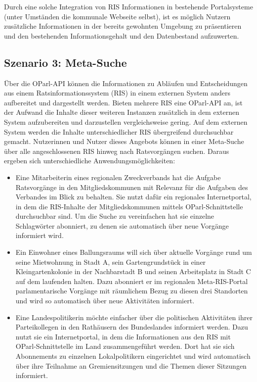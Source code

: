 \documentclass[,a4paper]{article}
\begin{document}
Durch eine solche Integration von RIS Informationen in bestehende
Portalsysteme (unter Umständen die kommunale Webseite selbst), ist es
möglich Nutzern zusätzliche Informationen in der bereits gewohnten
Umgebung zu präsentieren und den bestehenden Informationsgehalt und den
Datenbestand aufzuwerten.

\subsection{Szenario 3: Meta-Suche}\label{szenarioux5fmetaux5fsuche}

Über die OParl-API können die Informationen zu Abläufen und
Entscheidungen aus einem Ratsinformationssystem (RIS) in einem externen
System anders aufbereitet und dargestellt werden. Bieten mehrere RIS
eine OParl-API an, ist der Aufwand die Inhalte dieser weiteren Instanzen
zusätzlich in dem externen System aufzubereiten und darzustellen
vergleichsweise gering. Auf dem externen System werden die Inhalte
unterschiedlicher RIS übergreifend durchsuchbar gemacht. Nutzerinnen und
Nutzer dieses Angebots können in einer Meta-Suche über alle
angeschlossenen RIS hinweg nach Ratsvorgängen suchen. Daraus ergeben
sich unterschiedliche Anwendungsmöglichkeiten:

\begin{itemize}
\itemsep1pt\parskip0pt
\item
  Eine Mitarbeiterin eines regionalen Zweckverbands hat die Aufgabe
  Ratsvorgänge in den Mitgliedskommunen mit Relevanz für die Aufgaben
  des Verbandes im Blick zu behalten. Sie nutzt dafür ein regionales
  Internetportal, in dem die RIS-Inhalte der Mitgliedskommunen mittels
  OParl-Schnittstelle durchsuchbar sind. Um die Suche zu vereinfachen
  hat sie einzelne Schlagwörter abonniert, zu denen sie automatisch über
  neue Vorgänge informiert wird.
\item
  Ein Einwohner eines Ballungsraums will sich über aktuelle Vorgänge
  rund um seine Mietwohnung in Stadt A, sein Gartengrundstück in einer
  Kleingartenkolonie in der Nachbarstadt B und seinen Arbeitsplatz in
  Stadt C auf dem laufenden halten. Dazu abonniert er im regionalen
  Meta-RIS-Portal parlamentarische Vorgänge mit räumlichem Bezug zu
  diesen drei Standorten und wird so automatisch über neue Aktivitäten
  informiert.
\item
  Eine Landespolitikerin möchte einfacher über die politischen
  Aktivitäten ihrer Parteikollegen in den Rathäusern des Bundeslandes
  informiert werden. Dazu nutzt sie ein Internetportal, in dem die
  Informationen aus den RIS mit OParl-Schnittstelle im Land
  zusammengeführt werden. Dort hat sie sich Abonnements zu einzelnen
  Lokalpolitikern eingerichtet und wird automatisch über ihre Teilnahme
  an Gremiensitzungen und die Themen dieser Sitzungen informiert.
\end{itemize}
\end{document}
